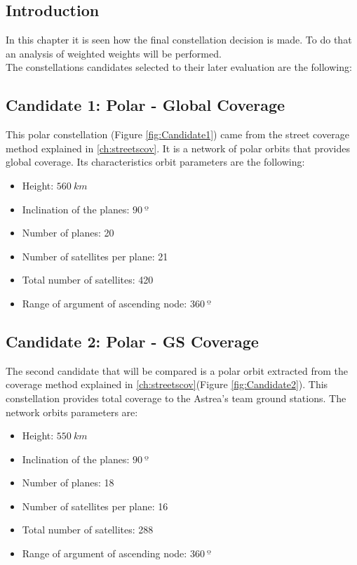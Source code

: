 \subsection{Introduction} 
In this chapter it is seen how the final constellation decision is made. To do that an analysis of weighted weights will be performed.\\

The constellations candidates selected to their later evaluation are the following:

\subsection{Candidate 1: Polar - Global Coverage}

This polar constellation (Figure \ref{fig:Candidate1}) came from the street coverage method explained in \ref{ch:streetscov}. It is a network of polar orbits that provides global coverage. Its characteristics orbit parameters are the following:

\begin{itemize}
\item Height: $560~{km}$ 
\item Inclination of the planes: $90~{º}$  
\item Number of planes: 20
\item Number of satellites per plane: 21
\item Total number of satellites: 420
\item Range of argument of ascending node: $360~{º}$ 
\end{itemize}


\subsection{Candidate 2: Polar - GS Coverage}
 
The second candidate that will be compared is a polar orbit extracted from the coverage method explained in \ref{ch:streetscov}(Figure \ref{fig:Candidate2}). This constellation provides total coverage to the Astrea's team ground stations. The network orbits parameters are:

\begin{itemize}
\item Height: $550~{km}$ 
\item Inclination of the planes: $90~{º}$  
\item Number of planes: 18
\item Number of satellites per plane: 16
\item Total number of satellites: 288
\item Range of argument of ascending node: $360~{º}$ 
\end{itemize}


